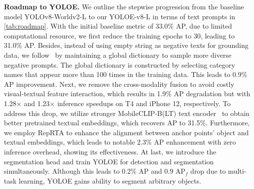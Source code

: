 \documentclass[10pt,twocolumn,letterpaper]{article}
\begin{document}
\textbf{Roadmap to YOLOE.} We outline the stepwise progression from the baseline model YOLOv8-Worldv2-L to our YOLOE-v8-L in terms of text prompts in \cref{tab:roadmap}. With the initial baseline metric of 33.0\% AP, due to limited computational resource, we first reduce the training epochs to 30, leading to 31.0\% AP. Besides, instead of using empty string as negative texts for grounding data, we follow~\cite{yao2022detclip} by maintaining a global dictionary to sample more diverse negative prompts. The global dictionary is constructed by selecting category names that appear more than 100 times in the training data. This leads to 0.9\% AP improvement. Next, we remove the cross-modality fusion to avoid costly visual-textual feature interaction, which results in 1.9\% AP degradation but with 1.28$\times$ and 1.23$\times$ inference speedups on T4 and iPhone 12, respectively. To address this drop, we utilize stronger MobileCLIP-B(LT) text encoder~\cite{vasu2024mobileclip} to obtain better pretrained textual embeddings, which recovers AP to 31.5\%. Furthermore, we employ RepRTA to enhance the alignment between anchor points' object and textual embeddings, which leads to notable 2.3\% AP enhancement with zero inference overhead, showing its effectiveness. At last, we introduce the segmentation head and train YOLOE for detection and segmentation simultaneously. Although this leads to 0.2\% AP and 0.9 AP$_f$ drop due to multi-task learning, YOLOE gains ability to segment arbitrary objects.
\end{document}
